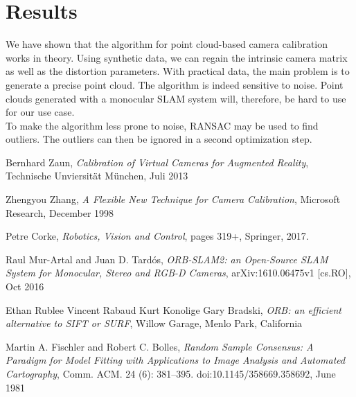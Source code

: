 \documentclass[conference,nofonttune]{IEEEtran}
\begin{document}
\section{Results}
We have shown that the algorithm for point cloud-based camera calibration works in theory. Using synthetic data, we can regain the intrinsic camera matrix as well as the distortion parameters. With practical data, the main problem is to generate a precise point cloud. The algorithm is indeed sensitive to noise. Point clouds generated with a monocular SLAM system will, therefore, be hard to use for our use case.\\
To make the algorithm less prone to noise, RANSAC \cite{ransac} may be used to find outliers. The outliers can then be ignored in a second optimization step.

%
%
%
\begin{thebibliography}{1}
    
Bernhard Zaun,
\textit{Calibration of Virtual Cameras for Augmented Reality},
Technische Unviersität München, Juli 2013 

Zhengyou Zhang,
\textit{A Flexible New Technique for Camera Calibration},
Microsoft Research, December 1998

Petre Corke,
\textit{Robotics, Vision and Control}, pages 319+, Springer, 2017.

Raul Mur-Artal and Juan D. Tardós,
\textit{ORB-SLAM2: an Open-Source SLAM System for Monocular, Stereo and RGB-D Cameras},
arXiv:1610.06475v1 [cs.RO], Oct 2016

Ethan Rublee Vincent Rabaud Kurt Konolige Gary Bradski,
\textit{ORB: an efficient alternative to SIFT or SURF},
Willow Garage, Menlo Park, California

Martin A. Fischler and Robert C. Bolles, 
\textit{Random Sample Consensus: A Paradigm for Model Fitting with Applications to Image Analysis and Automated Cartography}, 
Comm. ACM. 24 (6): 381–395. doi:10.1145/358669.358692, June 1981
\end{thebibliography}


\end{document}
